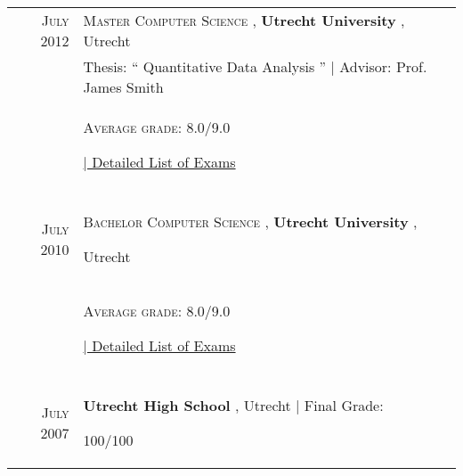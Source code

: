 \documentclass[a4paper,10pt]{article} %
\begin{document}
\begin{tabular}{rl}	
\textsc{
July %
} 
2012 %
 & \textsc{
Master Computer Science %
}, \textbf{
Utrecht University %
}, 
Utrecht	%
\\

& Thesis: ``
Quantitative Data Analysis %
'' | \small Advisor: 
Prof. James Smith %
\\
&
\normalsize \textsc{Average grade}: 
8.0/9.0 %

\hyperlink{
grds %
}{\hfill | \footnotesize Detailed List of Exams}\\
&\\


\textsc{
July %
} 
2010 %
 & \textsc{
Bachelor Computer Science %
}, 
\textbf{
Utrecht University %
}, 

Utrecht	%
\\

&
\normalsize \textsc{Average grade}: 
8.0/9.0 %

\hyperlink{
grds_usc %
}{\hfill | \footnotesize Detailed List of Exams}\\
&\\


\textsc{July} 2007 & \textbf{
Utrecht High School 
}, 
Utrecht
 | 
Final Grade: 

100/100 %

\end{tabular}
\end{document}
